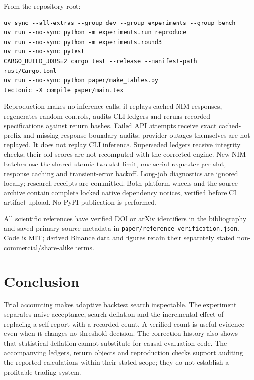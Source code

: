 \documentclass[11pt]{article}
\begin{document}
From the repository root:
\begin{verbatim}
uv sync --all-extras --group dev --group experiments --group bench
uv run --no-sync python -m experiments.run reproduce
uv run --no-sync python -m experiments.round3
uv run --no-sync pytest
CARGO_BUILD_JOBS=2 cargo test --release --manifest-path rust/Cargo.toml
uv run --no-sync python paper/make_tables.py
tectonic -X compile paper/main.tex
\end{verbatim}
Reproduction makes no inference calls: it replays cached NIM responses, regenerates
random controls, audits CLI ledgers and reruns recorded specifications against
return hashes. Failed API attempts receive exact cached-prefix and missing-response
boundary audits; provider outages themselves are not replayed. It does not replay CLI inference. Superseded ledgers receive
integrity checks; their old scores are not recomputed with the corrected engine.
New NIM batches use the shared atomic two-slot limit, one serial requester per
slot, response caching and transient-error backoff. Long-job diagnostics are
ignored locally; research receipts are committed. Both platform wheels and the
source archive contain complete locked native dependency notices, verified before
CI artifact upload. No PyPI publication is performed.

All scientific references have verified DOI or arXiv identifiers in the
bibliography and saved primary-source metadata in
\texttt{paper/reference\_verification.json}. Code is MIT; derived Binance data
and figures retain their separately stated non-commercial/share-alike terms.

\section{Conclusion}
Trial accounting makes adaptive backtest search inspectable. The experiment
separates naive acceptance, search deflation and the incremental effect of
replacing a self-report with a recorded count. \PrimaryDecisionSentence{}
A verified count is useful evidence even when it changes no threshold decision.
The correction history also shows that statistical deflation cannot substitute
for causal evaluation code. The accompanying ledgers, return objects and
reproduction checks support auditing the reported calculations within their
stated scope; they do not establish a profitable trading system.



\end{document}
